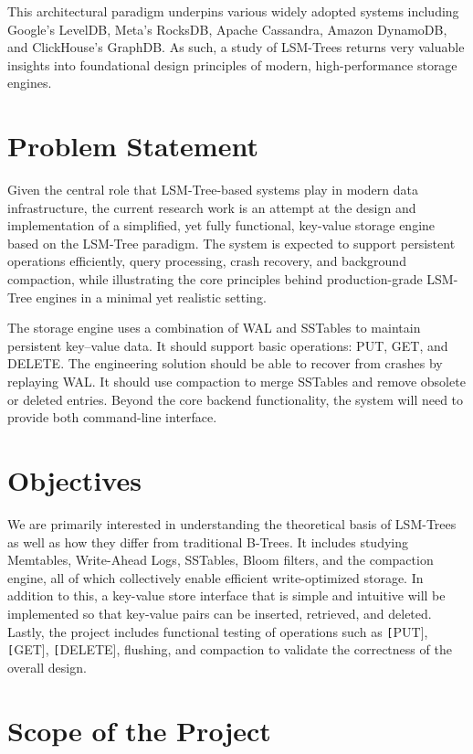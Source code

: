 \documentclass{mnitjaipur}
\begin{document}
This architectural paradigm underpins various widely adopted systems including Google’s LevelDB, Meta’s RocksDB, Apache Cassandra, Amazon DynamoDB, and ClickHouse’s GraphDB. As such, a study of LSM-Trees returns very valuable insights into foundational design principles of modern, high-performance storage engines.


\section{Problem Statement}

Given the central role that LSM-Tree-based systems play in modern data infrastructure, the current research work is an attempt at the design and implementation of a simplified, yet fully functional, key-value storage engine based on the LSM-Tree paradigm. The system is expected to support persistent operations efficiently, query processing, crash recovery, and background compaction, while illustrating the core principles behind production-grade LSM-Tree engines in a minimal yet realistic setting.

The storage engine uses a combination of WAL and SSTables to maintain persistent key–value data. It should support basic operations: PUT, GET, and DELETE. The engineering solution should be able to recover from crashes by replaying WAL. It should use compaction to merge SSTables and remove obsolete or deleted entries. Beyond the core backend functionality, the system will need to provide both command-line interface.


\section{Objectives}

We are primarily interested in understanding the theoretical basis of LSM-Trees as well as how they differ from traditional B-Trees. It includes studying Memtables, Write-Ahead Logs, SSTables, Bloom filters, and the compaction engine, all of which collectively enable efficient write-optimized storage. In addition to this, a key-value store interface that is simple and intuitive will be implemented so that key-value pairs can be inserted, retrieved, and deleted.  Lastly, the project includes functional testing of operations such as \texttt[PUT], \texttt[GET], \texttt[DELETE], flushing, and compaction to validate the correctness of the overall design.

\section{Scope of the Project}
\end{document}
